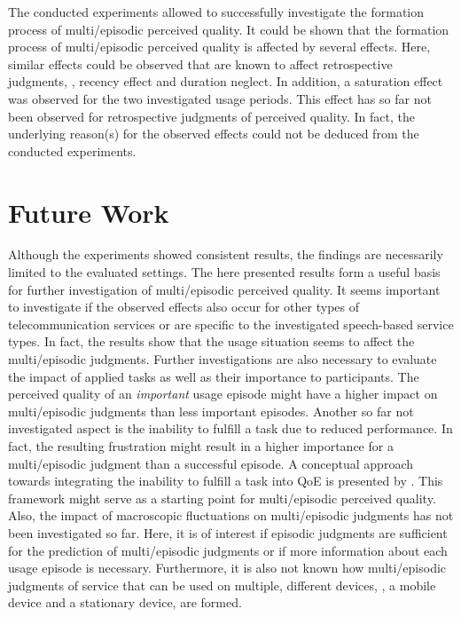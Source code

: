 The conducted experiments allowed to successfully investigate the formation process of multi\-/episodic perceived quality.
It could be shown that the formation process of multi\-/episodic perceived quality is affected by several effects.
Here, similar effects could be observed that are known to affect retrospective judgments, \ie, recency effect and duration neglect.
In addition, a saturation effect was observed for the two investigated usage periods.
This effect has so far not been observed for retrospective judgments of perceived quality.
In fact, the underlying reason(s) for the observed effects could not be deduced from the conducted experiments.

\section{Future Work}
Although the experiments showed consistent results, the findings are necessarily limited to the evaluated settings.
The here presented results form a useful basis for further investigation of multi\-/episodic perceived quality.
It seems important to investigate if the observed effects also occur for other types of telecommunication services or are specific to the investigated speech-based service types.
In fact, the results show that the usage situation seems to affect the multi\-/episodic judgments.
Further investigations are also necessary to evaluate the impact of applied tasks as well as their importance to participants.
The perceived quality of an \emph{important} usage episode might have a higher impact on multi\-/episodic judgments than less important episodes.
Another so far not investigated aspect is the inability to fulfill a task due to reduced performance.
In fact, the resulting frustration might result in a higher importance for a multi\-/episodic judgment than a successful episode.
A conceptual approach towards integrating the inability to fulfill a task into \ac{QoE} is presented by \citet{leon-garcia_generalizing_2014}.
This framework might serve as a starting point for multi\-/episodic perceived quality.
Also, the impact of macroscopic fluctuations on multi\-/episodic judgments has not been investigated so far.
Here, it is of interest if episodic judgments are sufficient for the prediction of multi\-/episodic judgments or if more information about each usage episode is necessary.
Furthermore, it is also not known how multi\-/episodic judgments of service that can be used on multiple, different devices, \eg, a mobile device and a stationary device, are formed.
